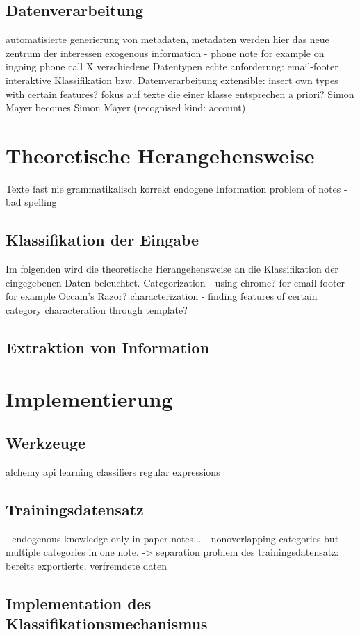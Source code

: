 \subsection{Datenverarbeitung}
automatisierte generierung von metadaten, metadaten werden hier das neue zentrum der interessen
exogenous information - phone note for example on ingoing phone call
X verschiedene Datentypen
echte anforderung: email-footer
interaktive Klassifikation bzw. Datenverarbeitung
extensible: insert own types with certain features?
fokus auf texte die einer klasse entsprechen
a priori?
Simon Mayer becomes Simon Mayer (recognised kind: account)
\section{Theoretische Herangehensweise}
Texte fast nie grammatikalisch korrekt
endogene Information
problem of notes - bad spelling
\subsection{Klassifikation der Eingabe}
Im folgenden wird die theoretische Herangehensweise an die Klassifikation der eingegebenen Daten beleuchtet.
Categorization - using chrome? for email footer for example
Occam's Razor?
characterization - finding features of certain category
characteration through template?
\subsection{Extraktion von Information}

\section{Implementierung}
\subsection{Werkzeuge}
alchemy api
learning classifiers
regular expressions

\subsection{Trainingsdatensatz}
- endogenous knowledge only in paper notes...
- nonoverlapping categories but multiple categories in one note. -> separation
problem des trainingsdatensatz: bereits exportierte, verfremdete daten
\subsection{Implementation des Klassifikationsmechanismus}

